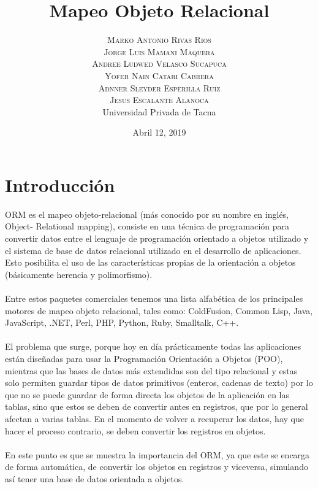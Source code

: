 \documentclass[twoside,twocolumn]{article}
\title{Mapeo Objeto Relacional} %
\author{%
\textsc{Marko Antonio Rivas Rios} \\[1ex] %
\textsc{Jorge Luis Mamani Maquera} \\[1.01ex] %
\textsc{Andree Ludwed Velasco Sucapuca} \\[1.02ex] %
\textsc{Yofer Nain Catari Cabrera} \\[1.03ex] %
\textsc{Adnner Sleyder Esperilla Ruiz} \\[1.04ex] %
\textsc{Jesus Escalante Alanoca} \\[1.05ex] %
\normalsize Universidad Privada de Tacna \\ %
\normalsize {} %
}
\date{Abril 12, 2019} %
\begin{document}
\maketitle


\section{Introducción}

\lettrine[nindent=0em,lines=3]{O}RM es el mapeo objeto-relacional (más conocido por su nombre en inglés, Object- Relational mapping), consiste en una técnica de programación para convertir datos entre el lenguaje de programación orientado a objetos utilizado y el sistema de base de datos relacional utilizado en el desarrollo de aplicaciones. Esto posibilita el uso de las características propias de la orientación a objetos (básicamente herencia y polimorfismo).\textbf{}\\
\textbf{}\\
Entre estos paquetes comerciales tenemos una lista alfabética de los principales motores de mapeo objeto relacional, tales como: ColdFusion, Common Lisp, Java, JavaScript, .NET, Perl, PHP, Python, Ruby, Smalltalk, C++.\textbf{}\\
\textbf{}\\
El problema que surge, porque hoy en día prácticamente todas las aplicaciones están diseñadas para usar la Programación Orientación a Objetos (POO), mientras que las bases de datos más extendidas son del tipo relacional y estas solo permiten guardar tipos de datos primitivos (enteros, cadenas de texto) por lo que no se puede guardar de forma directa los objetos de la aplicación en las tablas, sino que estos se deben de convertir antes en registros, que por lo general afectan a varias tablas. En el momento de volver a recuperar los datos, hay que hacer el proceso contrario, se deben convertir los registros en objetos. \textbf{}\\
\textbf{}\\
En este punto es que se muestra la importancia del ORM, ya que este se encarga de forma automática, de convertir los objetos en registros y viceversa, simulando así tener una base de datos orientada a objetos.
\end{document}
